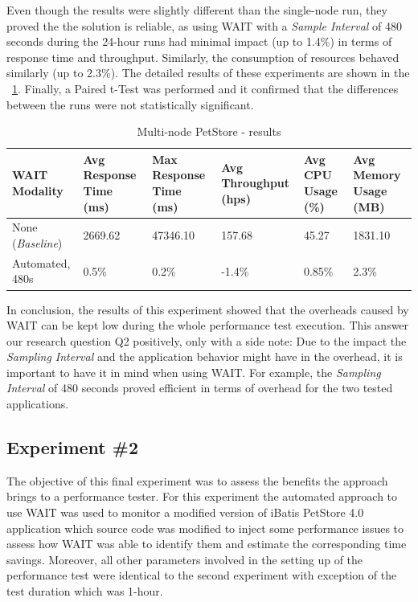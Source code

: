 \documentclass[runningheads,a4paper]{llncs}
\begin{document}
Even though the results were slightly different than the single-node run,
they proved the the solution is reliable, as using WAIT with a
\emph{Sample Interval} of 480 seconds during the 24-hour runs had minimal impact
(up to 1.4\%) in terms of response time and throughput. Similarly, the
consumption of resources behaved similarly (up to 2.3\%). The detailed results of 
these experiments are shown in the \tablename ~\ref{Portal2}. Finally, a
Paired t-Test was performed and it confirmed that the differences between the
runs were not statistically significant.

\begin{table}[!h]
\caption{Multi-node PetStore - results}
\label{Portal2}
\centering
\begin{tabular}{p{}|p{}|p{}|p{}|p{}|p{}}
\hline
\bfseries WAIT Modality & \bfseries Avg Response Time (ms)& \bfseries Max
Response Time (ms)& \bfseries Avg Throughput (hps)& \bfseries Avg CPU Usage
(\%) & \bfseries Avg Memory Usage (MB)\\
\hline
None (\emph{Baseline}) 	& 2669.62	& 47346.10	& 157.68 	& 45.27 	& 1831.10\\
Automated, 480s 		& 0.5\%		& 0.2\%		& -1.4\% 	& 0.85\% 	& 2.3\%\\
\hline
\end{tabular}
\end{table}


In conclusion, the results of this experiment showed that the overheads
caused by WAIT can be kept low during the whole performance test
execution. This answer our research question Q2 positively, only with a side
note: Due to the impact the \emph{Sampling Interval} and the application
behavior might have in the overhead, it is important to have it in mind when
using WAIT. For example, the \emph{Sampling Interval} of 480 seconds proved
efficient in terms of overhead for the two tested applications.


\subsection{Experiment \#2}

The objective of this final experiment was to assess the benefits the approach
brings to a performance tester. For this experiment the automated approach to
use WAIT was used to monitor a modified version of iBatis PetStore 4.0 application 
which source code was modified to inject some performance issues to assess how 
WAIT was able to identify them and estimate the corresponding time savings.
Moreover, all other parameters involved in the setting up of the performance test 
were identical to the second experiment with exception of the test duration
which was 1-hour.
\end{document}
